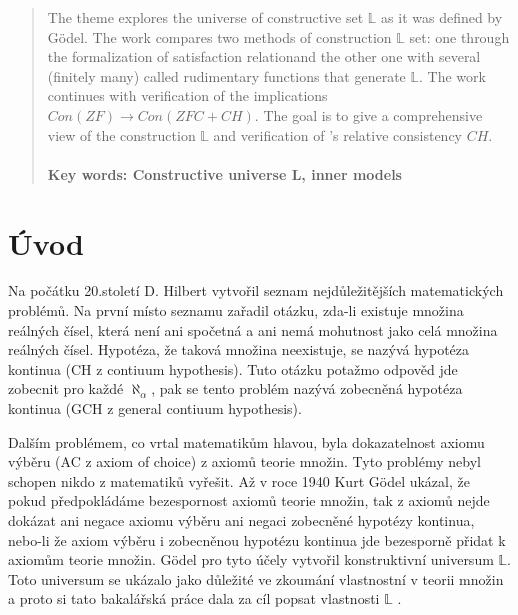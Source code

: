 \documentclass[12pt,a4paper]{article}
\begin{document}
\bigskip
\renewcommand{\abstractname}{Abstract}
\begin{abstract}
\noindent 
The theme explores the universe of constructive set $\mathbb{L}$ as it was defined by G\"{o}del. The work compares two methods of construction $\mathbb{L}$ set: one through the formalization of satisfaction relationand the other one with several (finitely many) called rudimentary functions that generate $\mathbb{L}$. The work continues with verification of the implications $ Con(ZF) \rightarrow Con(ZFC + CH) $.  The goal is to give a comprehensive view of the construction $\mathbb{L}$ and verification of 's relative consistency $ CH $.
\\
~\\
\textbf{Key words: Constructive universe L, inner models}
\end{abstract}
\clearpage

\tableofcontents
\clearpage


\pagestyle{fancy} %
\renewcommand{\sectionmark}[1]{\markboth{\slshape\thesection.\ #1}{}}
\section{\'{U}vod}

Na po\v{c}\'{a}tku 20.stolet\'{i} D. Hilbert vytvo\v{r}il seznam nejd\r{u}le\v{z}it\v{e}j\v{s}\'{i}ch matematick\'{y}ch probl\'{e}m\r{u}. Na prvn\'{i} m\'{i}sto seznamu za\v{r}adil ot\'{a}zku, zda-li existuje mno\v{z}ina  re\'{a}ln\'{y}ch \v{c}\'{i}sel, kter\'{a} nen\'{i} ani spo\v{c}etn\'{a} a ani nem\'{a} mohutnost jako cel\'{a} mno\v{z}ina re\'{a}ln\'{y}ch \v{c}\'{i}sel. Hypot\'{e}za, \v{z}e takov\'{a} mno\v{z}ina neexistuje, se naz\'{y}v\'{a} hypot\'{e}za kontinua (CH z contiuum hypothesis). Tuto ot\'{a}zku pota\v{z}mo odpov\v{e}d jde zobecnit pro ka\v{z}d\'{e} $ \aleph_\alpha $, pak se tento probl\'{e}m naz\'{y}v\'{a} zobecn\v{e}n\'{a} hypot\'{e}za kontinua (GCH z general contiuum hypothesis).

Dal\v{s}\'{i}m probl\'{e}mem, co vrtal matematik\r{u}m hlavou, byla dokazatelnost axiomu v\'{y}b\v{e}ru (AC z axiom of choice) z axiom\r{u} teorie mno\v{z}in. Tyto probl\'{e}my nebyl schopen nikdo z matematik\r{u} vy\v{r}e\v{s}it. A\v{z} v roce 1940 Kurt G\"{o}del uk\'{a}zal, \v{z}e pokud p\v{r}edpokl\'{a}d\'{a}me bezespornost axiom\r{u} teorie mno\v{z}in, tak z axiom\r{u} nejde dok\'{a}zat ani negace axiomu v\'{y}b\v{e}ru ani negaci zobecn\v{e}n\'{e} hypot\'{e}zy kontinua, nebo-li \v{z}e axiom v\'{y}b\v{e}ru i zobecn\v{e}nou hypot\'{e}zu kontinua jde bezesporn\v{e} p\v{r}idat k axiom\r{u}m teorie mno\v{z}in. G\"{o}del pro tyto \'{u}\v{c}ely vytvo\v{r}il konstruktivn\'{i} universum $\mathbb{L}$. Toto universum se uk\'{a}zalo jako d\r{u}le\v{z}it\'{e} ve zkoum\'{a}n\'{i} vlastnostn\'{i} v teorii mno\v{z}in a proto si tato bakal\'{a}\v{r}sk\'{a} pr\'{a}ce dala za c\'{i}l popsat vlastnosti $\mathbb{L}$ .
\end{document}
